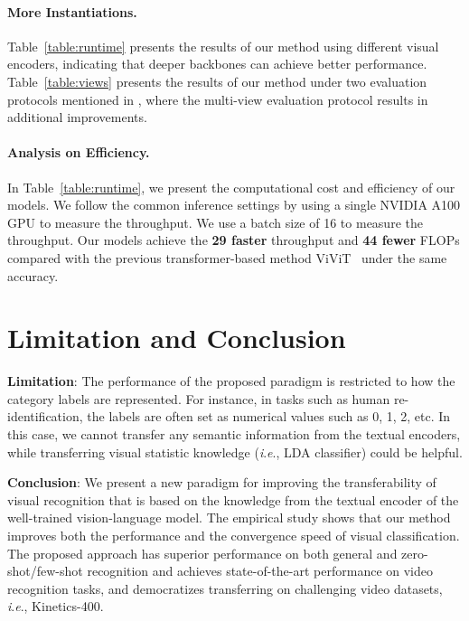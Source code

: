 \documentclass[letterpaper]{article} \usepackage{aaai23}  \usepackage{times}  \usepackage{helvet}  \usepackage{courier}  \usepackage[hyphens]{url}  \usepackage{graphicx} \urlstyle{rm} \def\UrlFont{\rm}  \usepackage{natbib}  \usepackage{caption} \frenchspacing  \setlength{\pdfpagewidth}{8.5in}  \setlength{\pdfpageheight}{11in}  \usepackage{algorithm}
\newcommand{\ie}{\textit{i}.\textit{e}.}
\begin{document}
\paragraph{More Instantiations.} 
Table~\ref{table:runtime} presents the results of our method using different visual encoders, indicating that deeper backbones can achieve better performance. Table~\ref{table:views} presents the results of our method under two evaluation protocols mentioned in , where the multi-view evaluation protocol results in additional improvements.












\paragraph{Analysis on Efficiency.}
In Table~\ref{table:runtime}, we present the computational cost and efficiency of our models. We follow the common inference settings by using a single NVIDIA A100 GPU to measure the throughput. We use a batch size of 16 to measure the throughput. 
Our models achieve the \textbf{29 faster} throughput and \textbf{44 fewer} FLOPs compared with the previous transformer-based method ViViT~\cite{arnab2021vivit} under the same accuracy.









 






 \section{Limitation and Conclusion}
\textbf{Limitation}:
The performance of the proposed paradigm is restricted to how the category labels are represented. For instance, in tasks such as human re-identification, the labels are often set as numerical values such as 0, 1, 2, etc. In this case, we cannot transfer any semantic information from the textual encoders, while transferring visual statistic knowledge (\ie, LDA classifier) could be helpful.


\noindent\textbf{Conclusion}:
We present a new paradigm for improving the transferability of visual recognition that is based on the knowledge from the textual encoder of the well-trained vision-language model.
The empirical study shows that our method improves both the performance and the convergence speed of visual classification. 
The proposed approach has superior performance on both general and zero-shot/few-shot recognition and achieves state-of-the-art performance on video recognition tasks, and democratizes transferring on challenging video datasets, \ie, Kinetics-400.
 
\end{document}

